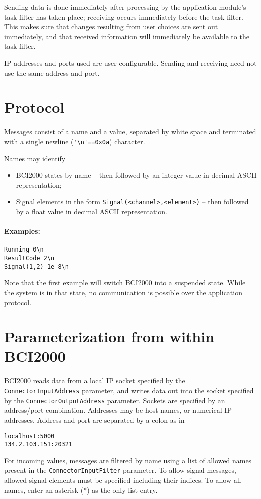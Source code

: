 \documentclass[12pt,a4paper,notitlepage]{article}
\begin{document}
Sending data is done immediately after processing by the application module's task filter has taken place; 
receiving occurs immediately before the task filter.
This makes sure that changes resulting from user choices are sent out immediately, and that 
received information will immediately be available to the task filter.

IP addresses and ports used are user-configurable. Sending and receiving need not use the same address and port.


\section{Protocol}

Messages consist of a name and a value, separated by white space
and terminated with a single newline (\verb|'\n'==0x0a|) character.

Names may identify
\begin{itemize}
\item BCI2000 states by name -- then followed
   by an integer value in decimal ASCII representation;
\item Signal elements in the form \texttt{Signal(<channel>,<element>)} --
   then followed by a float value in decimal ASCII representation.
\end{itemize}

\paragraph{Examples:}
\begin{verbatim}
Running 0\n
ResultCode 2\n
Signal(1,2) 1e-8\n
\end{verbatim}

Note that the first example will switch BCI2000 into a suspended state.
While the system is in that state, no communication is possible over the application protocol.

\section{Parameterization from within BCI2000}

BCI2000 reads data from a local IP socket specified by the 
\texttt{ConnectorInputAddress} parameter, and writes data out into the socket specified by the 
\texttt{ConnectorOutputAddress} parameter.
Sockets are specified by an address/port combination.
Addresses may be host names, or numerical IP addresses. Address and port are separated by
a colon as in
\begin{verbatim}
localhost:5000
134.2.103.151:20321
\end{verbatim}

For incoming values, messages are filtered by name using a list of allowed names 
present in the \texttt{ConnectorInputFilter} parameter. 
To allow signal messages, allowed signal elements must be specified including their
indices.
To allow all names, enter an asterisk (*) as the only list entry.
\end{document}
